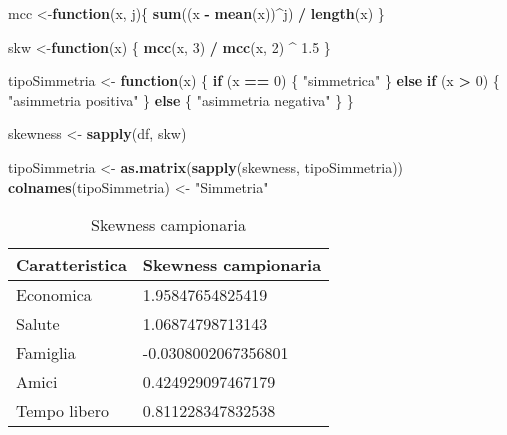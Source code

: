 \documentclass[]{book}
\newenvironment{Shaded}{\begin{snugshade}}{\end{snugshade}}
\newcommand{\KeywordTok}[1]{\textcolor[rgb]{0.13,0.29,0.53}{\textbf{#1}}}
\newcommand{\DecValTok}[1]{\textcolor[rgb]{0.00,0.00,0.81}{#1}}
\newcommand{\FloatTok}[1]{\textcolor[rgb]{0.00,0.00,0.81}{#1}}
\newcommand{\StringTok}[1]{\textcolor[rgb]{0.31,0.60,0.02}{#1}}
\newcommand{\ControlFlowTok}[1]{\textcolor[rgb]{0.13,0.29,0.53}{\textbf{#1}}}
\newcommand{\OperatorTok}[1]{\textcolor[rgb]{0.81,0.36,0.00}{\textbf{#1}}}
\newcommand{\NormalTok}[1]{#1}
\begin{document}
\begin{Shaded}
\begin{Highlighting}[]
\NormalTok{mcc <-}\ControlFlowTok{function}\NormalTok{(x, j)\{}
      \KeywordTok{sum}\NormalTok{((x }\OperatorTok{-}\StringTok{ }\KeywordTok{mean}\NormalTok{(x))}\OperatorTok{^}\NormalTok{j) }\OperatorTok{/}\StringTok{ }\KeywordTok{length}\NormalTok{(x)}
\NormalTok{\}}

\NormalTok{skw <-}\ControlFlowTok{function}\NormalTok{(x) \{}
    \KeywordTok{mcc}\NormalTok{(x, }\DecValTok{3}\NormalTok{) }\OperatorTok{/}\StringTok{ }\KeywordTok{mcc}\NormalTok{(x, }\DecValTok{2}\NormalTok{) }\OperatorTok{^}\StringTok{ }\FloatTok{1.5}
\NormalTok{\}}

\NormalTok{tipoSimmetria <-}\StringTok{ }\ControlFlowTok{function}\NormalTok{(x) \{}
  \ControlFlowTok{if}\NormalTok{ (x }\OperatorTok{==}\StringTok{ }\DecValTok{0}\NormalTok{) \{}
    \StringTok{"simmetrica"}
\NormalTok{  \} }\ControlFlowTok{else} \ControlFlowTok{if}\NormalTok{ (x }\OperatorTok{>}\StringTok{ }\DecValTok{0}\NormalTok{) \{}
    \StringTok{"asimmetria positiva"}
\NormalTok{  \} }\ControlFlowTok{else}\NormalTok{ \{}
    \StringTok{"asimmetria negativa"}
\NormalTok{  \}}
\NormalTok{\}}

\NormalTok{skewness <-}\StringTok{ }\KeywordTok{sapply}\NormalTok{(df, skw)}

\NormalTok{tipoSimmetria <-}\StringTok{ }\KeywordTok{as.matrix}\NormalTok{(}\KeywordTok{sapply}\NormalTok{(skewness, tipoSimmetria))}
\KeywordTok{colnames}\NormalTok{(tipoSimmetria) <-}\StringTok{ "Simmetria"}
\end{Highlighting}
\end{Shaded}

\begin{table}

\caption{\label{tab:skewness}Skewness campionaria}
\centering
\begin{tabular}[t]{l|l}
\hline
Caratteristica & Skewness campionaria\\
\hline
Economica & 1.95847654825419\\
\hline
Salute & 1.06874798713143\\
\hline
Famiglia & -0.0308002067356801\\
\hline
Amici & 0.424929097467179\\
\hline
Tempo libero & 0.811228347832538\\
\hline
\end{tabular}
\end{table}
\end{document}
